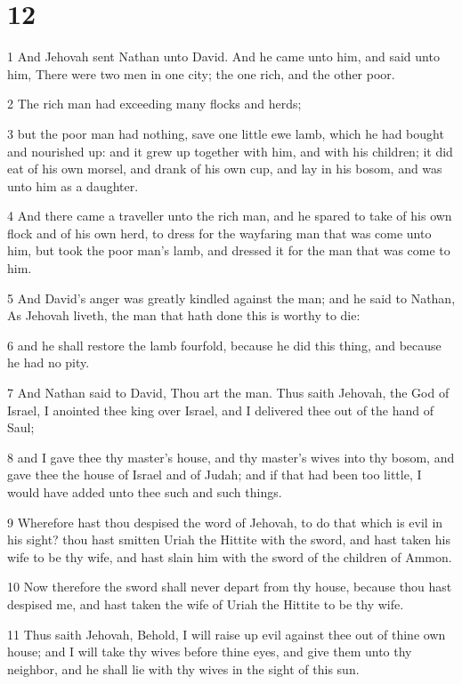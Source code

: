 \chapter{12}

\par 1 And Jehovah sent Nathan unto David. And he came unto him, and said unto him, There were two men in one city; the one rich, and the other poor.
\par 2 The rich man had exceeding many flocks and herds;
\par 3 but the poor man had nothing, save one little ewe lamb, which he had bought and nourished up: and it grew up together with him, and with his children; it did eat of his own morsel, and drank of his own cup, and lay in his bosom, and was unto him as a daughter.
\par 4 And there came a traveller unto the rich man, and he spared to take of his own flock and of his own herd, to dress for the wayfaring man that was come unto him, but took the poor man's lamb, and dressed it for the man that was come to him.
\par 5 And David's anger was greatly kindled against the man; and he said to Nathan, As Jehovah liveth, the man that hath done this is worthy to die:
\par 6 and he shall restore the lamb fourfold, because he did this thing, and because he had no pity.
\par 7 And Nathan said to David, Thou art the man. Thus saith Jehovah, the God of Israel, I anointed thee king over Israel, and I delivered thee out of the hand of Saul;
\par 8 and I gave thee thy master's house, and thy master's wives into thy bosom, and gave thee the house of Israel and of Judah; and if that had been too little, I would have added unto thee such and such things.
\par 9 Wherefore hast thou despised the word of Jehovah, to do that which is evil in his sight? thou hast smitten Uriah the Hittite with the sword, and hast taken his wife to be thy wife, and hast slain him with the sword of the children of Ammon.
\par 10 Now therefore the sword shall never depart from thy house, because thou hast despised me, and hast taken the wife of Uriah the Hittite to be thy wife.
\par 11 Thus saith Jehovah, Behold, I will raise up evil against thee out of thine own house; and I will take thy wives before thine eyes, and give them unto thy neighbor, and he shall lie with thy wives in the sight of this sun.
